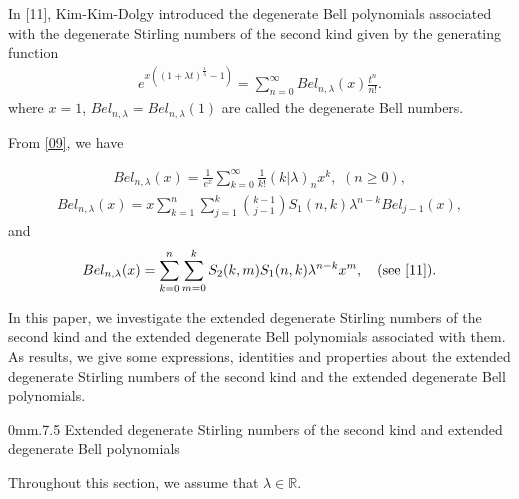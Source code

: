 \documentclass[10pt,twoside,reqno]{amsart}
\numberwithin{equation}{section}
\begin{document}
In [11], Kim-Kim-Dolgy introduced the degenerate Bell polynomials associated with the degenerate Stirling numbers of the second kind given by the generating function 
\begin{equation}\begin{split}\label{09}
e^{x((1+\lambda t)^{\frac{1}{\lambda }}-1)} = \sum_{n=0}^\infty Bel_{n,\lambda }(x) \frac{t^n}{n!}.
\end{split}\end{equation}
where $x=1$, $Bel_{n,\lambda }=Bel_{n,\lambda }(1) $ are called the degenerate Bell numbers.

From \eqref{09}, we have

\begin{equation}\begin{split}\label{10}
Bel_{n,\lambda }(x) = \frac{1}{e^x} \sum_{k=0}^\infty \frac{1}{k!} (k|\lambda )_n x^k, \,\,(n \geq 0),
\end{split}\end{equation} 
\begin{equation}\begin{split}\label{11}
Bel_{n,\lambda }(x) = x \sum_{k=1}^n \sum_{j=1}^k {k-1 \choose j-1} S_1(n,k) \lambda ^{n-k} Bel_{j-1}(x),
\end{split}\end{equation}
and
\begin{equation}\begin{split}\label{12}
Bel_{n,\lambda }(x) = \sum_{k=0}^n \sum_{m=0}^k S_2(k,m) S_1(n,k) \lambda ^{n-k} x^m,\quad (\textnormal{see} \,\, [11]).
\end{split}\end{equation}

In this paper, we investigate the extended degenerate Stirling numbers of the second kind and the extended degenerate Bell polynomials associated with them. As results, we give some expressions, identities and properties about the extended degenerate Stirling numbers of the second kind and the extended degenerate Bell polynomials.

{  {0mm}{.7\linespacing\@plus\linespacing}{.5\linespacing}
  {\normalfont\bfseries\centering}}{Extended degenerate Stirling numbers of the second kind and extended degenerate Bell polynomials}

Throughout this section, we assume that $\lambda \in \mathbb{R}$.
\end{document}
